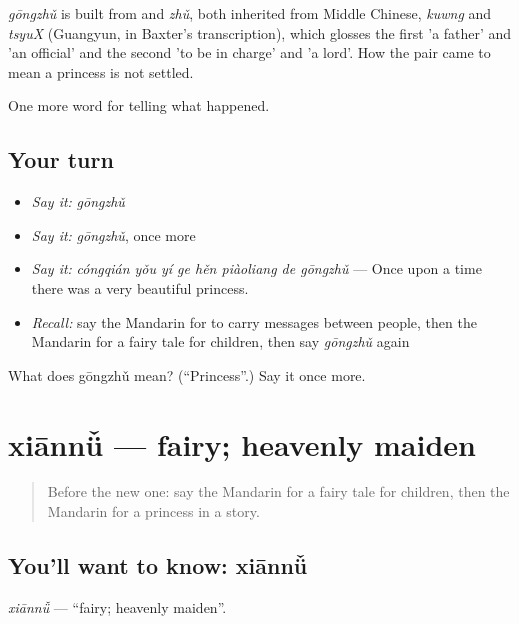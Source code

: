 \begin{cousinweb}
\emph{gōngzhǔ} is built from  and \emph{zhǔ}, both inherited from Middle Chinese, \emph{kuwng} and \emph{tsyuX} (Guangyun, in Baxter's transcription), which glosses the first 'a father' and 'an official' and the second 'to be in charge' and 'a lord'. How the pair came to mean a princess is not settled.
\end{cousinweb}

\begin{grammarlens}[title={What you've built}]
One more word for telling what happened.
\end{grammarlens}

\subsection*{Your turn}
\begin{itemize}
\raggedright
  \item \emph{Say it:} \emph{gōngzhǔ}
  \item \emph{Say it:} \emph{gōngzhǔ}, once more
  \item \emph{Say it:} \emph{cóngqián yǒu yí ge hěn piàoliang de gōngzhǔ} — Once upon a time there was a very beautiful princess.
  \item \emph{Recall:} say the Mandarin for to carry messages between people, then the Mandarin for a fairy tale for children, then say \emph{gōngzhǔ} again
\end{itemize}

\begin{tcolorbox}[breakable,colback=teal!4,colframe=teal!35!black,title={Before you move on}]
What does gōngzhǔ mean? (\textquotedblleft{}Princess\textquotedblright{}.) Say it once more.
\end{tcolorbox}
\section[xiānnǚ]{xiānnǚ — fairy; heavenly maiden}

\label{lesson:ZH-C329-xiannu}



\begin{quote}
Before the new one: say the Mandarin for a fairy tale for children, then the Mandarin for a princess in a story.
\end{quote}

\subsection*{You'll want to know: xiānnǚ}
\emph{xiānnǚ} — \textquotedblleft{}fairy; heavenly maiden\textquotedblright{}.

